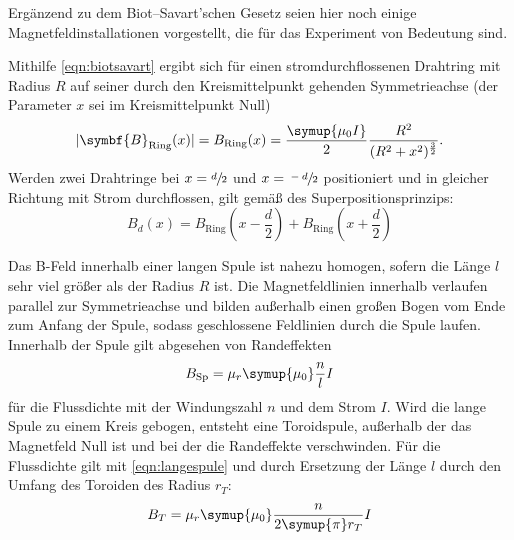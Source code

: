 Ergänzend zu dem Biot--Savart'schen Gesetz seien hier noch einige Magnetfeldinstallationen vorgestellt, die für das Experiment %
von Bedeutung sind.

Mithilfe \eqref{eqn:biotsavart} ergibt sich für einen stromdurchflossenen Drahtring mit Radius $R$ auf seiner durch den Kreismittelpunkt 
gehenden Symmetrieachse (der Parameter $x$ sei im Kreismittelpunkt Null)
\begin{equation}
    \lvert\symbf{B}_\text{Ring}(x)\rvert = B_\text{Ring}(x) = \frac{\symup{\mu_0 I}}{2} \frac{R^2}{(R^2 + x^2)^{\frac{3}{2}}}.
    \label{eqn:ring}
\end{equation}
Werden zwei Drahtringe bei $x=\sfrac{d}{2}$ und $x=\sfrac{-d}{2}$ positioniert und in gleicher Richtung mit Strom durchflossen,
gilt gemäß des Superpositionsprinzips: 
\begin{equation}
    B_d(x)=B_\text{Ring}(x-\frac{d}{2}) + B_\text{Ring}(x+\frac{d}{2})
    \label{eqn:2ringe}
\end{equation}

Das B-Feld innerhalb einer langen Spule ist nahezu homogen, sofern die Länge $l$ sehr viel größer als der Radius $R$ ist. 
Die Magnetfeldlinien innerhalb verlaufen parallel zur Symmetrieachse und bilden außerhalb einen großen 
Bogen vom Ende zum Anfang der Spule, sodass geschlossene Feldlinien durch die Spule laufen.
Innerhalb der Spule gilt abgesehen von Randeffekten 
\begin{equation}
    B_\text{Sp} = \mu_r \symup{\mu_0} \frac{n}{l} I
    \label{eqn:langespule}
\end{equation}
für die Flussdichte mit der Windungszahl $n$ und dem Strom $I$. 
Wird die lange Spule zu einem Kreis gebogen, entsteht eine Toroidspule, außerhalb der das Magnetfeld Null ist und bei der 
die Randeffekte verschwinden. 
Für die Flussdichte gilt mit \eqref{eqn:langespule} und durch Ersetzung der Länge $l$ durch den Umfang des Toroiden des Radius $r_T$:
\begin{equation}
    B_T=\mu_r \symup{\mu_0} \frac{n}{2 \symup{\pi} r_T} I
    \label{eqn:toroid}
\end{equation}
